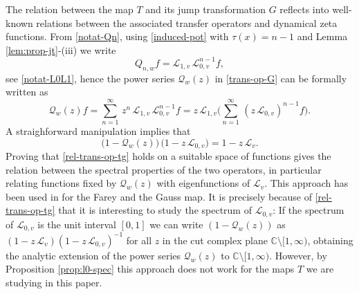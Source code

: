 \documentclass[11pt]{amsart}
\theoremstyle{definition}
\theoremstyle{remark}
\theoremstyle{definition}
\numberwithin{equation}{section}
\newcommand{\C}{\mathbb C}
\newcommand{\LL}{\mathcal{L}}
\newcommand{\QQ}{\mathcal{Q}}
\begin{document}
The relation between the map $T$ and its jump transformation $G$ reflects into well-known relations between the associated transfer operators and dynamical zeta functions. From \eqref{notat-Qn}, using \eqref{induced-pot} with $\tau(x)=n-1$ and Lemma \ref{lem:prop-jt}-(iii) we write
\[
Q_{n,w}f = \LL_{1,v} \, \LL_{0,v}^{n-1} f,
\]
see \eqref{notat-L0L1}, hence the power series $\QQ_w(z)$ in \eqref{trans-op-G} can be formally written as
\[
\QQ_w(z) f = \sum_{n=1}^\infty\, z^n\, \LL_{1,v} \, \LL_{0,v}^{n-1} f = z\, \LL_{1,v} \Big( \sum_{n=1}^\infty\, (z\, \LL_{0,v})^{n-1} f \Big).
\]
A straighforward manipulation implies that
\begin{equation}\label{rel-trans-op-tg}
\Big(1-\QQ_w(z)\Big) \, \Big(1-z\, \LL_{0,v}\Big) = 1-z\, \LL_v.
\end{equation}
Proving that \eqref{rel-trans-op-tg} holds on a suitable space of functions gives the relation between the spectral properties of the two operators, in particular relating functions fixed by $\QQ_w(z)$ with eigenfunctions of $\LL_v$. This approach has been used in \cite{Is1,BI} for the Farey and the Gauss map. It is precisely because of \eqref{rel-trans-op-tg} that it is interesting to study the spectrum of $ \LL_{0,v}$: If the spectrum of $ \LL_{0,v}$ is the unit interval $[0,1]$ we can write $(1-\QQ_w(z))$ as $(1-z\, \LL_v)(1-z\, \LL_{0,v})^{-1}$ for all $z$ in the cut complex plane $\C\setminus [1,\infty)$, obtaining the analytic extension of the power series $\QQ_w(z)$ to $\C\setminus [1,\infty)$. However, by Proposition \ref{prop:l0-spec} this approach does not work for the maps $T$ we are studying in this paper.
\end{document}
